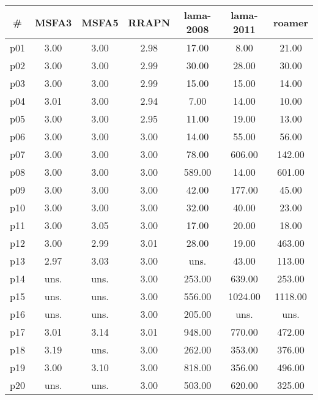 \begin{tabular}{ccccccc}
\toprule
\textbf{\#} & \textbf{MSFA3} & \textbf{MSFA5} & \textbf{RRAPN} & \textbf{lama-2008} & \textbf{lama-2011} & \textbf{roamer}\\
\midrule
p01 & 3.00 & 3.00 & 2.98 & 17.00 & 8.00 & 21.00\\
p02 & 3.00 & 3.00 & 2.99 & 30.00 & 28.00 & 30.00\\
p03 & 3.00 & 3.00 & 2.99 & 15.00 & 15.00 & 14.00\\
p04 & 3.01 & 3.00 & 2.94 & 7.00 & 14.00 & 10.00\\
p05 & 3.00 & 3.00 & 2.95 & 11.00 & 19.00 & 13.00\\
p06 & 3.00 & 3.00 & 3.00 & 14.00 & 55.00 & 56.00\\
p07 & 3.00 & 3.00 & 3.00 & 78.00 & 606.00 & 142.00\\
p08 & 3.00 & 3.00 & 3.00 & 589.00 & 14.00 & 601.00\\
p09 & 3.00 & 3.00 & 3.00 & 42.00 & 177.00 & 45.00\\
p10 & 3.00 & 3.00 & 3.00 & 32.00 & 40.00 & 23.00\\
p11 & 3.00 & 3.05 & 3.00 & 17.00 & 20.00 & 18.00\\
p12 & 3.00 & 2.99 & 3.01 & 28.00 & 19.00 & 463.00\\
p13 & 2.97 & 3.03 & 3.00 & uns. & 43.00 & 113.00\\
p14 & uns. & uns. & 3.00 & 253.00 & 639.00 & 253.00\\
p15 & uns. & uns. & 3.00 & 556.00 & 1024.00 & 1118.00\\
p16 & uns. & uns. & 3.00 & 205.00 & uns. & uns.\\
p17 & 3.01 & 3.14 & 3.01 & 948.00 & 770.00 & 472.00\\
p18 & 3.19 & uns. & 3.00 & 262.00 & 353.00 & 376.00\\
p19 & 3.00 & 3.10 & 3.00 & 818.00 & 356.00 & 496.00\\
p20 & uns. & uns. & 3.00 & 503.00 & 620.00 & 325.00\\
\bottomrule
\end{tabular}

